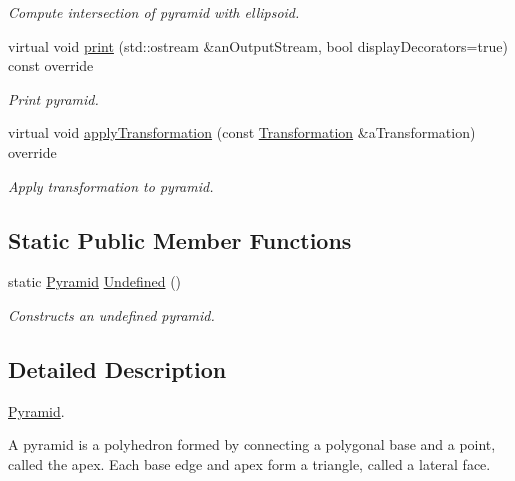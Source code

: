 \begin{DoxyCompactItemize}
\begin{DoxyCompactList}\small\item\em Compute intersection of pyramid with ellipsoid. \end{DoxyCompactList}\item 
virtual void \hyperlink{classlibrary_1_1math_1_1geom_1_1d3_1_1objects_1_1_pyramid_a150cd331b3dc6e36c74b37bc6988f019}{print} (std\+::ostream \&an\+Output\+Stream, bool display\+Decorators=true) const override
\begin{DoxyCompactList}\small\item\em Print pyramid. \end{DoxyCompactList}\item 
virtual void \hyperlink{classlibrary_1_1math_1_1geom_1_1d3_1_1objects_1_1_pyramid_a79d9b11e42c47213e2eb9538e52a2103}{apply\+Transformation} (const \hyperlink{classlibrary_1_1math_1_1geom_1_1d3_1_1_transformation}{Transformation} \&a\+Transformation) override
\begin{DoxyCompactList}\small\item\em Apply transformation to pyramid. \end{DoxyCompactList}\end{DoxyCompactItemize}
\subsection*{Static Public Member Functions}
\begin{DoxyCompactItemize}
\item 
static \hyperlink{classlibrary_1_1math_1_1geom_1_1d3_1_1objects_1_1_pyramid}{Pyramid} \hyperlink{classlibrary_1_1math_1_1geom_1_1d3_1_1objects_1_1_pyramid_a5de06284f14f60360867df40af4b7aac}{Undefined} ()
\begin{DoxyCompactList}\small\item\em Constructs an undefined pyramid. \end{DoxyCompactList}\end{DoxyCompactItemize}


\subsection{Detailed Description}
\hyperlink{classlibrary_1_1math_1_1geom_1_1d3_1_1objects_1_1_pyramid}{Pyramid}. 

A pyramid is a polyhedron formed by connecting a polygonal base and a point, called the apex. Each base edge and apex form a triangle, called a lateral face.

